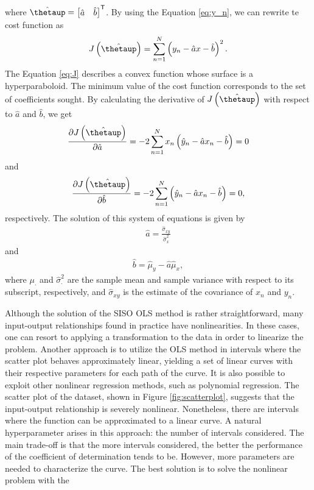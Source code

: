 \documentclass[english]{sobraep}
\newcommand{\trans}{\mathsf{T}}
\begin{document}
where \(\hat{\boldsymbol{\thetaup}} = \begin{bmatrix} \hat{a} & \hat{b} \end{bmatrix}^\trans\). By using the Equation \eqref{eq:y_n}, we can rewrite te cost function as
\begin{align}
    \label{eq:J}
    J\left( \hat{\boldsymbol{\thetaup}} \right) = \sum_{n=1}^{N} \left( y_n - \hat{a}x - \hat{b} \right)^2.
\end{align}
The Equation \eqref{eq:J} describes a convex function whose surface is a hyperparaboloid. The minimum value of the cost function corresponds to the set of coefficients sought. By calculating the derivative of \(J\left( \hat{\boldsymbol{\thetaup}} \right)\) with respect to \(\hat{a}\) and \(\hat{b}\), we get
\begin{align}
    \frac{\partial J\left( \hat{\boldsymbol{\thetaup}} \right)}{\partial \hat{a}} = -2 \sum_{n=1}^{N} x_n\left( \hat{y}_n - \hat{a}x_n - \hat{b} \right) = 0
\end{align}
and
\begin{align}
    \frac{\partial J\left( \hat{\boldsymbol{\thetaup}} \right)}{\partial \hat{b}} = -2 \sum_{n=1}^{N} \left( \hat{y}_n - \hat{a}x_n - \hat{b} \right) = 0,
\end{align}
respectively. The solution of this system of equations is given by
\begin{align}
    \hat{a} = \frac{\hat{\sigma}_{xy}}{\hat{\sigma}^2_x}
\end{align}
and
\begin{align}
\hat{b} = \hat{\mu}_y - \hat{a}\hat{\mu}_x,
\end{align}
where \(\mu_{\cdot}\) and \(\hat{\sigma}_{\cdot}^2\) are the sample mean and sample variance with respect to its subscript, respectively, and \(\hat{\sigma}_{xy}\) is the estimate of the covariance of \(x_n\) and \(y_n\).

Although the solution of the SISO OLS method is rather straightforward, many input-output relationships found in practice have nonlinearities. In these cases, one can resort to applying a transformation to the data in order to linearize the problem. Another approach is to utilize the OLS method in intervals where the scatter plot behaves approximately linear, yielding a set of linear curves with their respective parameters for each path of the curve. It is also possible to exploit other nonlinear regression methods, such as polynomial regression. The scatter plot of the dataset, shown in Figure \ref{fig:scatterplot}, suggests that the input-output relationship is severely nonlinear. Nonetheless, there are intervals where the function can be approximated to a linear curve. A natural hyperparameter arises in this approach: the number of intervals considered. The main trade-off is that the more intervals considered, the better the performance of the coefficient of determination tends to be. However, more parameters are needed to characterize the curve. The best solution is to solve the nonlinear problem with the
\end{document}
